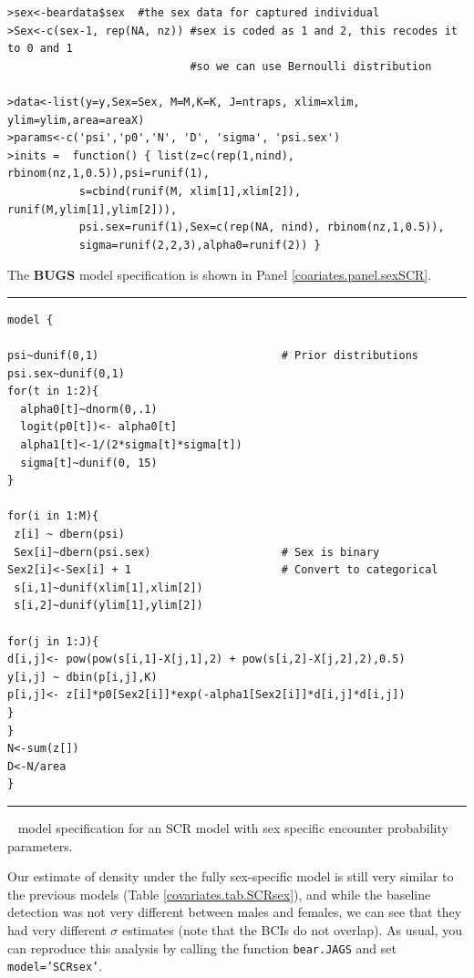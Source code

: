 {\small
\begin{verbatim}
>sex<-beardata$sex  #the sex data for captured individual
>Sex<-c(sex-1, rep(NA, nz)) #sex is coded as 1 and 2, this recodes it to 0 and 1
                            #so we can use Bernoulli distribution 

>data<-list(y=y,Sex=Sex, M=M,K=K, J=ntraps, xlim=xlim, ylim=ylim,area=areaX)
>params<-c('psi','p0','N', 'D', 'sigma', 'psi.sex')
>inits =  function() { list(z=c(rep(1,nind), rbinom(nz,1,0.5)),psi=runif(1), 
           s=cbind(runif(M, xlim[1],xlim[2]), runif(M,ylim[1],ylim[2])),
           psi.sex=runif(1),Sex=c(rep(NA, nind), rbinom(nz,1,0.5)), 
           sigma=runif(2,2,3),alpha0=runif(2)) }
\end{verbatim}
}
{\flushleft The} {\bf BUGS} model specification is shown in Panel 
\ref{coariates.panel.sexSCR}.

 
\begin{panel}[htp]
\centering
\rule[0.1in]{\textwidth}{.03in}
{\small
\begin{verbatim}
model {

psi~dunif(0,1)                            # Prior distributions
psi.sex~dunif(0,1)
for(t in 1:2){                             
  alpha0[t]~dnorm(0,.1)
  logit(p0[t])<- alpha0[t]
  alpha1[t]<-1/(2*sigma[t]*sigma[t])
  sigma[t]~dunif(0, 15)
}

for(i in 1:M){
 z[i] ~ dbern(psi)
 Sex[i]~dbern(psi.sex)                    # Sex is binary
Sex2[i]<-Sex[i] + 1                       # Convert to categorical
 s[i,1]~dunif(xlim[1],xlim[2])
 s[i,2]~dunif(ylim[1],ylim[2])

for(j in 1:J){
d[i,j]<- pow(pow(s[i,1]-X[j,1],2) + pow(s[i,2]-X[j,2],2),0.5)
y[i,j] ~ dbin(p[i,j],K)
p[i,j]<- z[i]*p0[Sex2[i]]*exp(-alpha1[Sex2[i]]*d[i,j]*d[i,j])
}
}
N<-sum(z[])
D<-N/area
}
\end{verbatim}
}

\rule[-0.1in]{\textwidth}{.03in}
\caption{
\jags~ model specification for an SCR model with sex specific 
encounter probability parameters.}
\label{covariates.panel.sexSCR}
\end{panel}

Our estimate of density under the fully sex-specific model is still
very similar to the previous models (Table
\ref{covariates.tab.SCRsex}), and while the baseline detection was not
very different between males and females, we can see that they had
very different $\sigma$ estimates (note that the BCIs do not overlap).
As usual, you can reproduce this analysis by calling the function 
{\tt bear.JAGS} and set {\tt model='SCRsex'}.

